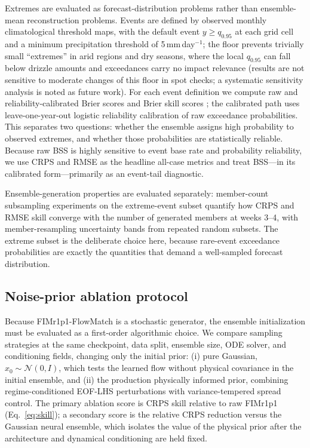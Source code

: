 \documentclass[11pt]{article}
\newcommand{\modelshort}{FIMr1p1}
\newcommand{\methodname}{\modelshort{}-FlowMatch}
\begin{document}
Extremes are evaluated as forecast-distribution problems rather than ensemble-mean reconstruction problems. Events are defined by observed monthly climatological threshold maps, with the default event $y \ge q_{0.95}$ at each grid cell and a minimum precipitation threshold of 5\,mm\,day$^{-1}$; the floor prevents trivially small ``extremes'' in arid regions and dry seasons, where the local $q_{0.95}$ can fall below drizzle amounts and exceedances carry no impact relevance (results are not sensitive to moderate changes of this floor in spot checks; a systematic sensitivity analysis is noted as future work). For each event definition we compute raw and reliability-calibrated Brier scores and Brier skill scores \citep{Brier1950,Murphy1973}; the calibrated path uses leave-one-year-out logistic reliability calibration of raw exceedance probabilities. This separates two questions: whether the ensemble assigns high probability to observed extremes, and whether those probabilities are statistically reliable. Because raw BSS is highly sensitive to event base rate and probability reliability, we use CRPS and RMSE as the headline all-case metrics and treat BSS---in its calibrated form---primarily as an event-tail diagnostic.

Ensemble-generation properties are evaluated separately: member-count subsampling experiments on the extreme-event subset quantify how CRPS and RMSE skill converge with the number of generated members at weeks 3--4, with member-resampling uncertainty bands from repeated random subsets. The extreme subset is the deliberate choice here, because rare-event exceedance probabilities are exactly the quantities that demand a well-sampled forecast distribution.

\subsection{Noise-prior ablation protocol}

Because \methodname{} is a stochastic generator, the ensemble initialization must be evaluated as a first-order algorithmic choice. We compare sampling strategies at the same checkpoint, data split, ensemble size, ODE solver, and conditioning fields, changing only the initial prior: (i) pure Gaussian, $x_0\sim\mathcal{N}(0,I)$, which tests the learned flow without physical covariance in the initial ensemble, and (ii) the production physically informed prior, combining regime-conditioned EOF-LHS perturbations with variance-tempered spread control. The primary ablation score is CRPS skill relative to raw \modelshort{} (Eq.~\ref{eq:skill}); a secondary score is the relative CRPS reduction versus the Gaussian neural ensemble, which isolates the value of the physical prior after the architecture and dynamical conditioning are held fixed.
\end{document}
